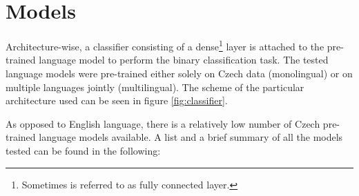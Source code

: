 \section{Models}
Architecture-wise, a classifier consisting of a dense\footnote{Sometimes is referred to as fully connected layer.} layer is attached to the pre-trained language model to perform the binary classification task. The tested language models were pre-trained either solely on Czech data (monolingual) or on multiple languages jointly (multilingual). The scheme of the particular architecture used can be seen in figure \ref{fig:classifier}.

As opposed to English language, there is a relatively low number of Czech pre-trained language models available. A list and a brief summary of all the models tested can be found in the following:



\begin{figure}
\end{figure}



